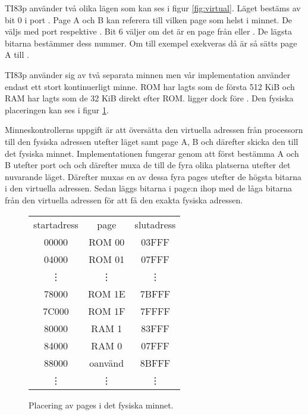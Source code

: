 \documentclass[main.tex]{subfiles}
\begin{document}
\vspace{-4mm}
TI83p använder två olika lägen som kan ses i figur \ref{fig:virtual}. Läget
bestäms av bit 0 i port . Page A och B kan referera till vilken page
som helst i minnet. De väljs med port  respektive . Bit 6
väljer om det är en page från  eller . De lägsta bitarna
bestämmer dess nummer. Om till exempel  exekveras då 
är  så sätts page A till .

TI83p använder sig av två separata minnen men vår implementation använder
endast ett stort kontinuerligt minne. ROM har lagts som de första 512 KiB och
RAM har lagts som de 32 KiB direkt efter ROM.  ligger dock före
. Den fysiska placeringen kan ses i figur \ref{fig:physical}.

Minneskontrollerns uppgift är att översätta den virtuella adressen från
processorn till den fysiska adressen utefter läget samt page A, B och därefter
skicka den till det fysiska minnet. Implementationen fungerar genom att först
bestämma A och B utefter port  och  och därefter muxa de till
de fyra olika platserna utefter det nuvarande läget. Därefter muxas en av dessa
fyra pages utefter de högsta bitarna i den virtuella adressen. Sedan läggs
bitarna i page:n ihop med de låga bitarna från den virtuella adressen för att
få den exakta fysiska adressen.
\vspace{-4mm}
\begin{figure}[H]
    \center
    \small\ttfamily\arraybackslash
    \begin{tabular}{c|c|c}
        \multicolumn{1}{c}{\normalfont startadress} &
        \multicolumn{1}{c}{\normalfont page} &
        \multicolumn{1}{c}{\normalfont slutadress} \\ \cline{2-2}
        00000  & ROM 00  & 03FFF \\ \cline{2-2}
        04000  & ROM 01  & 07FFF \\
        \multicolumn{1}{c}{\vdots} &
        \multicolumn{1}{c}{\vdots} & \vdots \\
        78000  & ROM 1E  & 7BFFF \\ \cline{2-2}
        7C000  & ROM 1F  & 7FFFF \\ \cline{2-2}
        80000  & RAM 1   & 83FFF \\ \cline{2-2}
        84000  & RAM 0   & 07FFF \\ \cline{2-2}
        88000  & oanvänd & 8BFFF \\ \cline{2-2}
        \vdots & \vdots  & \vdots \\
    \end{tabular}
    \caption{Placering av pages i det fysiska minnet.}
    \label{fig:physical}
\end{figure}
\end{document}
